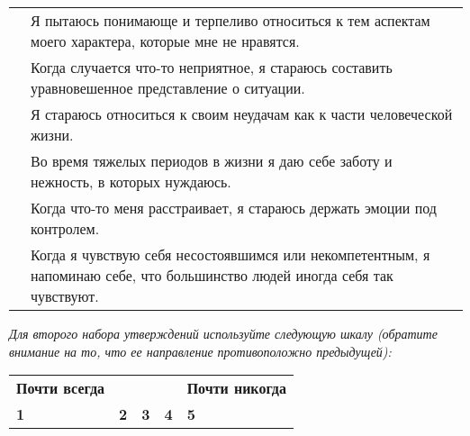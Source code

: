 \begin{center}
	\setlength{\extrarowheight}{2mm}
	\begin{tabularx}{\textwidth}{p{1.7cm}X}
		 \noindent\rule{1.7cm}{0.4pt} & Я пытаюсь понимающе и терпеливо относиться к тем аспектам моего характера, которые мне не нравятся. \\
		 \noindent\rule{1.7cm}{0.4pt} & Когда случается что-то неприятное, я стараюсь составить уравновешенное представление о ситуации.\\
		 \noindent\rule{1.7cm}{0.4pt} & Я стараюсь относиться к своим неудачам как к части человеческой жизни.\\
		 \noindent\rule{1.7cm}{0.4pt} & Во время тяжелых периодов в жизни я даю себе заботу и нежность, в которых нуждаюсь.\\
		 \noindent\rule{1.7cm}{0.4pt} & Когда что-то меня расстраивает, я стараюсь держать эмоции под контролем.\\
		 \noindent\rule{1.7cm}{0.4pt} & Когда я чувствую себя несостоявшимся или некомпетентным, я напоминаю себе, что большинство людей иногда себя так чувствуют.\\
	\end{tabularx}
	\setlength{\extrarowheight}{0mm}	
\end{center}

\newpage

\textit{Для второго набора утверждений используйте следующую шкалу (обратите внимание на то, что ее направление противоположно предыдущей):}

\begin{flushright}
	\setlength{\extrarowheight}{2mm}
	\begin{tabularx}{11.5cm}{XXXXX}
		\textbf{Почти всегда} & & & & \textbf{Почти никогда} \\
		\textbf{1} & \textbf{2} & \textbf{3} & \textbf{4} & \textbf{5} \\
	\end{tabularx}
	\setlength{\extrarowheight}{0mm}
\end{flushright}


